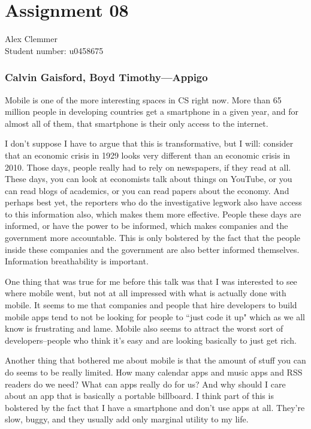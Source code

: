 \documentclass[a4paper]{article}
\begin{document}
\section*{Assignment 08}
Alex Clemmer \\
Student number: u0458675

\subsubsection*{Calvin Gaisford, Boyd Timothy---Appigo}

Mobile is one of the more interesting spaces in CS right now. More than 65 million people in developing countries get a smartphone in a given year, and for almost all of them, that smartphone is their only access to the internet.

I don't suppose I have to argue that this is transformative, but I will: consider that an economic crisis in 1929 looks very different than an economic crisis in 2010. Those days, people really had to rely on newspapers, if they read at all. These days, you can look at economists talk about things on YouTube, or you can read blogs of academics, or you can read papers about the economy. And perhaps best yet, the reporters who do the investigative legwork also have access to this information also, which makes them more effective. People these days are informed, or have the power to be informed, which makes companies and the government more accountable. This is only bolstered by the fact that the people inside these companies and the government are also better informed themselves. Information breathability is important.

One thing that was true for me before this talk was that I was interested to see where mobile went, but not at all impressed with what is actually done with mobile. It seems to me that companies and people that hire developers to build mobile apps tend to not be looking for people to ``just code it up" which as we all know is frustrating and lame. Mobile also seems to attract the worst sort of developers--people who think it's easy and are looking basically to just get rich.

Another thing that bothered me about mobile is that the amount of stuff you can do seems to be really limited. How many calendar apps and music apps and RSS readers do we need? What can apps really do for us? And why should I care about an app that is basically a portable billboard. I think part of this is bolstered by the fact that I have a smartphone and don't use apps at all. They're slow, buggy, and they usually add only marginal utility to my life.
\end{document}
